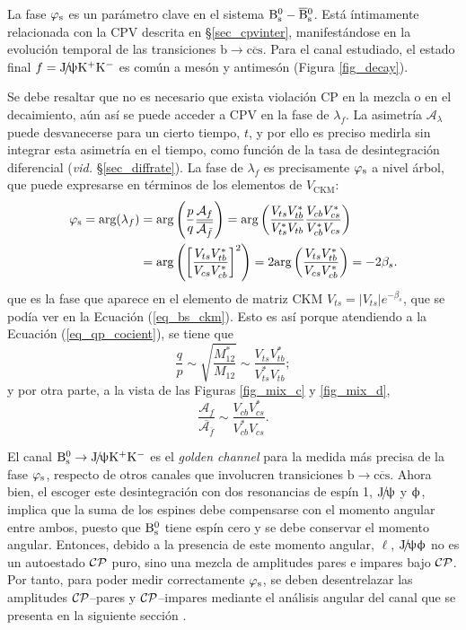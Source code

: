 La fase $\varphi_{\text{s}}$ es un parámetro clave en el sistema $\text{B}{}_{\text{s}}^{\text{0}} - \overline{\text{B}}{}_{\text{s}}^{\text{0}}$. Está íntimamente relacionada con la CPV descrita en \S \ref{sec_cpvinter}, manifestándose  en la evolución temporal de las transiciones $\mathrm{b \rightarrow c \overline{c}{s}}$. Para el canal estudiado, el estado final $f=\text{J}\!/\!\uppsi \text{K}{}^{+}\text{K}{}^{-}$ es común a mesón y antimesón (Figura \ref{fig_decay}). 

Se debe resaltar que no es necesario que exista violación CP en la mezcla o en el decaimiento, aún así se puede acceder a CPV en la fase de $\lambda_f$. La asimetría $\mathscr{A}_{\lambda}$ puede desvanecerse para un cierto tiempo, $t$, y por ello es preciso medirla sin integrar esta asimetría en el tiempo, como función de la tasa de desintegración diferencial (\emph{vid.} \S \ref{sec_diffrate}). La fase de $\lambda_f$ es precisamente $\varphi_{\text{s}}$ \color{vero} a nivel árbol, \color{norm} que puede expresarse en términos de los elementos de $V_{\text{CKM}}$:
\begin{equation}
\begin{split}
  \varphi_{\text{s}} = \text{arg} (\lambda_f) & =  \text{arg}\left(\frac{p}{q}  \frac{\mathcal{A}_f}{\overline{\mathcal{A}_{\bar{f}}}}\right) =   \text{arg}\left(\frac{V_{ts}V_{tb}^*}{V_{ts}^*V_{tb}} \frac{V_{cb}V_{cs}^*}{V_{cb}^*V_{cs}} \right) \\ &=   \text{arg} \left(  \left[ \frac{V_{ts} V_{tb}^*}{V_{cs} V_{cb}^*}  \right]^2  \right) = 2 \text{arg} \left(   \frac{V_{ts} V_{tb}^*}{V_{cs} V_{cb}^*}    \right)  =  - 2\beta_s.
\end{split}
\end{equation}
que es la fase que aparece en el elemento de matriz \textsc{CKM} $V_{ts} = |V_{ts}| e^{- \beta_s}$, que se podía ver en la Ecuación (\ref{eq_bs_ckm}).
%
Esto es así porque atendiendo a la Ecuación (\ref{eq_qp_cocient}), se tiene que
\[\frac{q}{p} \sim \sqrt{\frac {M_{12}^*} {M_{12}} } \sim \frac{V_{ts}V_{tb}^*}{V_{ts}^*V_{tb}}; \]
y por otra parte, a la vista de las Figuras \ref{fig_mix_c} y \ref{fig_mix_d},
\[\frac{\mathcal{A}_f}{\overline{\mathcal{A}_{\bar{f}}}} \sim \frac{V_{cb}V_{cs}^*}{V_{cb}^*V_{cs}}.\]



El canal $\text{B}{}_{\text{s}}^{\text{0}} \rightarrow \text{J}\!/\!\uppsi \text{K}{}^{+}\text{K}{}^{-}$ es el \emph{golden channel} para la medida más precisa de la fase $\varphi_{\text{s}}$, respecto de otros canales que involucren transiciones $\mathrm{b \rightarrow c\overline{c}s}$. Ahora bien, el escoger este desintegración con dos resonancias de \color{vero} espín 1, \color{norm} $\text{J}\!/\!\uppsi$ y $\upphi$, implica que la suma de los espines debe compensarse con el momento angular entre ambos, puesto que $\text{B}{}_{\text{s}}^{\text{0}}$ tiene espín cero y se debe conservar el momento angular. Entonces, debido a la presencia de este momento angular, $\ell$, $\text{J}\!/\!\uppsi \upphi$ no es un autoestado $\mathcal{CP}$ puro, sino una mezcla de amplitudes pares e impares bajo $\mathcal{CP}$. Por tanto, para poder medir correctamente $\varphi_{\text{s}}$, se deben desentrelazar las amplitudes $\mathcal{CP}$--pares y $\mathcal{CP}$--impares mediante el análisis angular del canal que se presenta en la siguiente sección \cite{paperPhis}.



